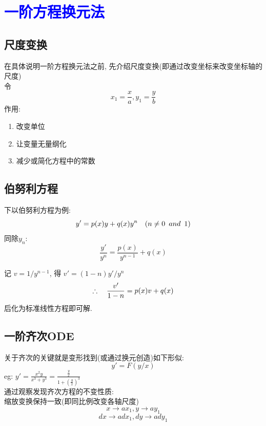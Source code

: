 \newpage

\section{\huge \textcolor{blue}{一阶方程换元法}}

\subsection{\LARGE 尺度变换}
在具体说明一阶方程换元法之前, 
先介绍尺度变换(即通过改变坐标来改变坐标轴的尺度)\\
令
\[ x_1 = \frac{x}{a}  , y_1 = \frac{y}{b} \]
作用:
\begin{enumerate}
    \item 改变单位
    \item 让变量无量纲化
    \item 减少或简化方程中的常数
\end{enumerate}

\subsection{\LARGE 伯努利方程}
下以伯努利方程为例:
{\Large
\begin{equation}
y' = p(x) y + q(x) y^n \hspace*{1em} 
(n \neq 0 \hspace*{0.5em}and\hspace*{0.5em} 1)
\end{equation}
}
同除$y_n$:
\[ \frac{y'}{y^n} = \frac{p(x)}{y^{n-1}} + q(x)  \]

记 $v = 1/y^{n-1}$, 得 $v' = (1-n) y' / y^n$
{\Large \[ \therefore \hspace*{1em} \frac{v'}{1-n} = p(x) v + q(x)  \] }
后化为标准线性方程即可解.

\subsection{\LARGE 一阶齐次ODE}
关于齐次的关键就是变形找到(或通过换元创造)如下形似:
{\Large
\begin{equation}
y' = F(y/x) 
\end{equation}
}
eg: $y' = \frac{x^2 y}{x^3 + y^3} = \frac{\frac{y}{x}}{1 + (\frac{y}{x})^3} $\\
通过观察发现齐次方程的不变性质:\\
\hspace*{2em}缩放变换保持一致(即同比例改变各轴尺度)
\[ x \rightarrow a x_1 , y \rightarrow a y_1  \]
\[ dx \rightarrow a dx_1 , dy \rightarrow a dy_1  \]

